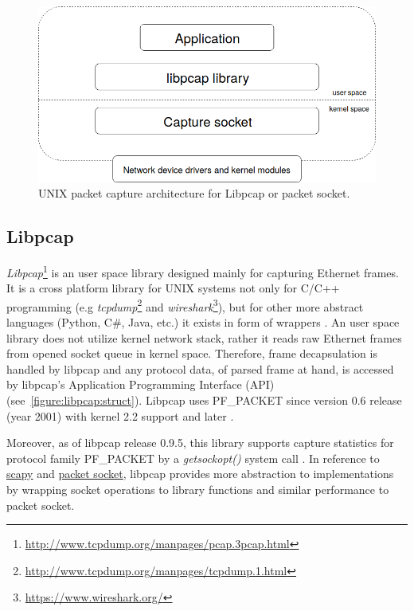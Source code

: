 \documentclass[12pt,a4paper,twoside]{book}
\begin{document}
            \begin{figure}[h]
                \centering
                \includegraphics[scale=0.4]{linux_net_capture_struct}
                \caption{UNIX packet capture architecture for Libpcap or packet socket.}
                \label{figure:libpcap:struct}
            \end{figure}
        \subsection{Libpcap} \label{analysis:mechs:libpcap}
            \emph{Libpcap}\footnote{\url{http://www.tcpdump.org/manpages/pcap.3pcap.html}} is an user space library designed mainly for capturing Ethernet frames. It is a cross platform library for UNIX systems not only for C/C++ programming (e.g \emph{tcpdump}\footnote{\url{http://www.tcpdump.org/manpages/tcpdump.1.html}} and \emph{wireshark}\footnote{\url{https://www.wireshark.org/}}), but for other more abstract languages (Python, C\#, Java, etc.) it exists in form of wrappers \cite{article:libpcap}. An user space library does not utilize kernel network stack, rather it reads raw Ethernet frames from opened socket queue in kernel space. Therefore, frame decapsulation is handled by libpcap and any protocol data, of parsed frame at hand, is accessed by libpcap's Application Programming Interface (API) (see~\autoref{figure:libpcap:struct}). Libpcap uses PF\_PACKET \cite{presentation:socket} \cite{report:libpcap} since version 0.6 release (year 2001) with kernel 2.2 support and later \cite{git:libpcap0.6:changes}.\par
            Moreover, as of libpcap release 0.9.5, this library supports capture statistics for protocol family PF\_PACKET by a \emph{getsockopt()} system call \cite{git:libpcap0.9:changes}. In reference to \hyperref[analysis:mechs:scapy_rss]{scapy} and \hyperref[analysis:mechs:socket]{packet socket}, libpcap provides more abstraction to implementations by wrapping socket operations to library functions and similar performance to packet socket.
\end{document}
